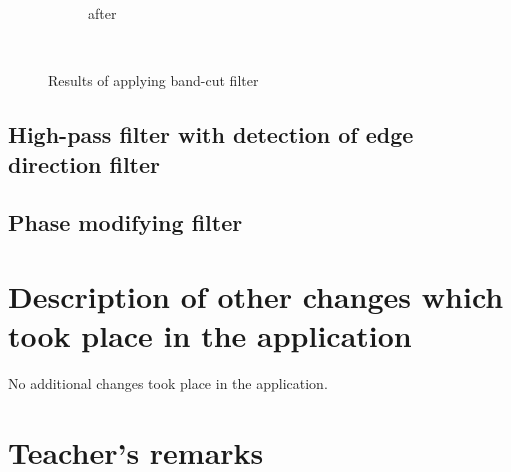 \documentclass[12pt]{article}
\begin{document}
\begin{figure}[H]
\begin{subfigure}[t]{\subfiguresize}
        \caption{after}
    \end{subfigure}\\[1em]
    \caption{Results of applying band-cut filter}
\end{figure}  
\subsection{High-pass filter with detection of edge direction filter}
\subsection{Phase modifying filter}
 
\section{Description of other changes which took place in the application}

No additional changes took place in the application.

\vfill
\section*{Teacher's remarks}
\begin{tabularx}{\textwidth}{|X|}
    \hline
    \vspace{7cm}
    \phantom{.} \\
    \hline
\end{tabularx}
\end{document}
